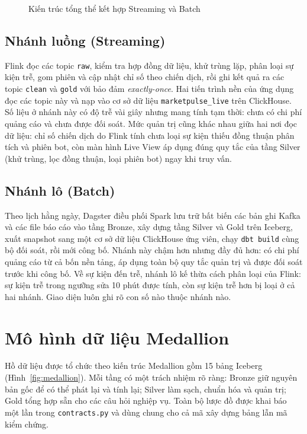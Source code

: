 \begin{figure}[H]
    \centering
    \resizebox{\textwidth}{!}{}
    \caption{Kiến trúc tổng thể kết hợp Streaming và Batch}
    \label{fig:architecture}
\end{figure}

\subsection{Nhánh luồng (Streaming)}
\label{sec:c2-streaming}
Flink đọc các topic \texttt{raw}, kiểm tra hợp đồng dữ liệu, khử trùng lặp, phân loại sự kiện trễ, gom phiên và cập nhật chỉ số theo chiến dịch, rồi ghi kết quả ra các topic \texttt{clean} và \texttt{gold} với bảo đảm \emph{exactly-once}. Hai tiến trình nền của ứng dụng đọc các topic này và nạp vào cơ sở dữ liệu \texttt{marketpulse\_live} trên ClickHouse. Số liệu ở nhánh này có độ trễ vài giây nhưng mang tính tạm thời: chưa có chi phí quảng cáo và chưa được đối soát. Mức quản trị cũng khác nhau giữa hai nơi đọc dữ liệu: chỉ số chiến dịch do Flink tính chưa loại sự kiện thiếu đồng thuận phân tích và phiên bot, còn màn hình Live View áp dụng đúng quy tắc của tầng Silver (khử trùng, lọc đồng thuận, loại phiên bot) ngay khi truy vấn.

\subsection{Nhánh lô (Batch)}
\label{sec:c2-batch}
Theo lịch hằng ngày, Dagster điều phối Spark lưu trữ bất biến các bản ghi Kafka và các file báo cáo vào tầng Bronze, xây dựng tầng Silver và Gold trên Iceberg, xuất snapshot sang một cơ sở dữ liệu ClickHouse ứng viên, chạy \texttt{dbt build} cùng bộ đối soát, rồi mới công bố. Nhánh này chậm hơn nhưng đầy đủ hơn: có chi phí quảng cáo từ cả bốn nền tảng, áp dụng toàn bộ quy tắc quản trị và được đối soát trước khi công bố. Về sự kiện đến trễ, nhánh lô kế thừa cách phân loại của Flink: sự kiện trễ trong ngưỡng sửa 10 phút được tính, còn sự kiện trễ hơn bị loại ở cả hai nhánh. Giao diện luôn ghi rõ con số nào thuộc nhánh nào.

\section{Mô hình dữ liệu Medallion}
\label{sec:c2-medallion}

Hồ dữ liệu được tổ chức theo kiến trúc Medallion gồm 15 bảng Iceberg (Hình~\ref{fig:medallion}). Mỗi tầng có một trách nhiệm rõ ràng: Bronze giữ nguyên bản gốc để có thể phát lại và tính lại; Silver làm sạch, chuẩn hóa và quản trị; Gold tổng hợp sẵn cho các câu hỏi nghiệp vụ. Toàn bộ lược đồ được khai báo một lần trong \texttt{contracts.py} và dùng chung cho cả mã xây dựng bảng lẫn mã kiểm chứng.

